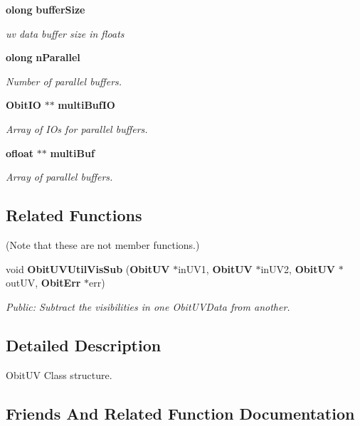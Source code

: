 \begin{CompactItemize}
{\bf olong} {\bf buffer\-Size}
\begin{CompactList}\small\item\em uv data buffer size in floats \item\end{CompactList}\item 
{\bf olong} {\bf n\-Parallel}
\begin{CompactList}\small\item\em Number of parallel buffers. \item\end{CompactList}\item 
{\bf Obit\-IO} $\ast$$\ast$ {\bf multi\-Buf\-IO}
\begin{CompactList}\small\item\em Array of IOs for parallel buffers. \item\end{CompactList}\item 
{\bf ofloat} $\ast$$\ast$ {\bf multi\-Buf}
\begin{CompactList}\small\item\em Array of parallel buffers. \item\end{CompactList}\end{CompactItemize}
\subsection*{Related Functions}
(Note that these are not member functions.) \begin{CompactItemize}
\item 
void {\bf Obit\-UVUtil\-Vis\-Sub} ({\bf Obit\-UV} $\ast$in\-UV1, {\bf Obit\-UV} $\ast$in\-UV2, {\bf Obit\-UV} $\ast$out\-UV, {\bf Obit\-Err} $\ast$err)
\begin{CompactList}\small\item\em Public: Subtract the visibilities in one Obit\-UVData from another. \item\end{CompactList}\end{CompactItemize}


\subsection{Detailed Description}
Obit\-UV Class structure. 



\subsection{Friends And Related Function Documentation}
